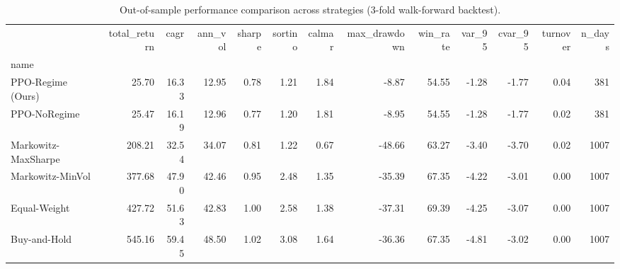 \begin{table}
\caption{Out-of-sample performance comparison across strategies (3-fold walk-forward backtest).}
\label{tab:results}
\begin{tabular}{lrrrrrrrrrrrr}
\toprule
 & total\_return & cagr & ann\_vol & sharpe & sortino & calmar & max\_drawdown & win\_rate & var\_95 & cvar\_95 & turnover & n\_days \\
name &  &  &  &  &  &  &  &  &  &  &  &  \\
\midrule
PPO-Regime (Ours) & 25.70 & 16.33 & 12.95 & 0.78 & 1.21 & 1.84 & -8.87 & 54.55 & -1.28 & -1.77 & 0.04 & 381 \\
PPO-NoRegime & 25.47 & 16.19 & 12.96 & 0.77 & 1.20 & 1.81 & -8.95 & 54.55 & -1.28 & -1.77 & 0.02 & 381 \\
Markowitz-MaxSharpe & 208.21 & 32.54 & 34.07 & 0.81 & 1.22 & 0.67 & -48.66 & 63.27 & -3.40 & -3.70 & 0.02 & 1007 \\
Markowitz-MinVol & 377.68 & 47.90 & 42.46 & 0.95 & 2.48 & 1.35 & -35.39 & 67.35 & -4.22 & -3.01 & 0.00 & 1007 \\
Equal-Weight & 427.72 & 51.63 & 42.83 & 1.00 & 2.58 & 1.38 & -37.31 & 69.39 & -4.25 & -3.07 & 0.00 & 1007 \\
Buy-and-Hold & 545.16 & 59.45 & 48.50 & 1.02 & 3.08 & 1.64 & -36.36 & 67.35 & -4.81 & -3.02 & 0.00 & 1007 \\
\bottomrule
\end{tabular}
\end{table}
